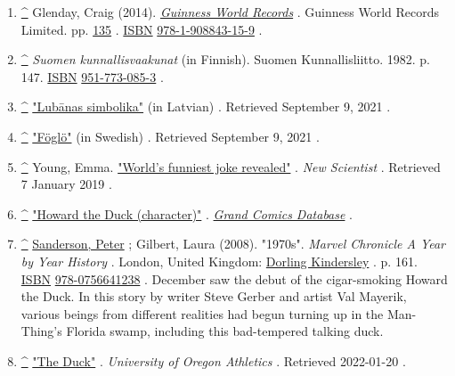 \documentclass[11pt,a4paper]{article}
\begin{document}
\begin{enumerate}
\item \href{\#cite\_ref-48}{\textbf{\textasciicircum{}}} Glenday, Craig (2014). \href{https://archive.org/details/guinnessworldrec0000unse\_r3e7/page/135}{\textit{Guinness World Records}} . Guinness World Records Limited. pp. \href{https://archive.org/details/guinnessworldrec0000unse\_r3e7/page/135}{135} . \href{/wiki/ISBN\_\%28identifier\%29}{ISBN} \href{/wiki/Special:BookSources/978-1-908843-15-9}{978-1-908843-15-9} .
\item \href{\#cite\_ref-49}{\textbf{\textasciicircum{}}} \textit{Suomen kunnallisvaakunat} (in Finnish). Suomen Kunnallisliitto. 1982. p. 147. \href{/wiki/ISBN\_\%28identifier\%29}{ISBN} \href{/wiki/Special:BookSources/951-773-085-3}{951-773-085-3} .
\item \href{\#cite\_ref-50}{\textbf{\textasciicircum{}}} \href{http://www.lubana.lv/index.php/lv/homepage/lubanas-pilseta-2}{"Lubānas simbolika"} (in Latvian) . Retrieved September 9, 2021 .
\item \href{\#cite\_ref-51}{\textbf{\textasciicircum{}}} \href{http://digi.narc.fi/digi/view.ka?kuid=1738595}{"Föglö"} (in Swedish) . Retrieved September 9, 2021 .
\item \href{\#cite\_ref-52}{\textbf{\textasciicircum{}}} Young, Emma. \href{https://www.newscientist.com/article/dn2876-worlds-funniest-joke-revealed/}{"World's funniest joke revealed"} . \textit{New Scientist} . Retrieved 7 January 2019 .
\item \href{\#cite\_ref-53}{\textbf{\textasciicircum{}}} \href{http://www.comics.org/character/name/Howard\%20the\%20Duck/sort/chrono/}{"Howard the Duck (character)"} . \href{/wiki/Grand\_Comics\_Database}{\textit{Grand Comics Database}} .
\item \href{\#cite\_ref-54}{\textbf{\textasciicircum{}}} \href{/wiki/Peter\_Sanderson}{Sanderson, Peter} ; Gilbert, Laura (2008). "1970s". \textit{Marvel Chronicle A Year by Year History} . London, United Kingdom: \href{/wiki/Dorling\_Kindersley}{Dorling Kindersley} . p. 161. \href{/wiki/ISBN\_\%28identifier\%29}{ISBN} \href{/wiki/Special:BookSources/978-0756641238}{978-0756641238} . December saw the debut of the cigar-smoking Howard the Duck. In this story by writer Steve Gerber and artist Val Mayerik, various beings from different realities had begun turning up in the Man-Thing's Florida swamp, including this bad-tempered talking duck.
\item \href{\#cite\_ref-55}{\textbf{\textasciicircum{}}} \href{https://goducks.com/sports/2003/8/28/153778.aspx}{"The Duck"} . \textit{University of Oregon Athletics} . Retrieved 2022-01-20 .
\end{enumerate}
\end{document}
